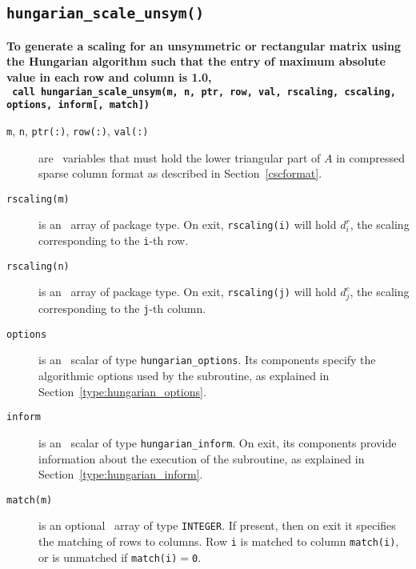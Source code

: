\subsection{\texttt{hungarian\_scale\_unsym()}}

\textbf{\noindent
   To generate a scaling for an unsymmetric or rectangular matrix using the Hungarian algorithm such that the entry of maximum absolute value in each row and column is 1.0,
   \vspace*{0.3cm} \\
   \texttt{ \hspace*{0.2cm}
      call hungarian\_scale\_unsym(m, n, ptr, row, val, rscaling, cscaling, options, inform[, match])
   }
   \vspace{0.3cm}
}

\begin{description}

\item[\texttt{m}, \texttt{n}, \texttt{ptr(:)}, \texttt{row(:)}, \texttt{val(:)}] are \intentin\ variables that must hold the lower triangular part of $A$ in compressed sparse column format as described in Section~\ref{cscformat}.

\item[\texttt{rscaling(m)}] is an \intentout\ array of package type. On exit,
\texttt{rscaling(i)} will hold $d^r_i$, the scaling corresponding to the
\texttt{i}-th row.

\item[\texttt{rscaling(n)}] is an \intentout\ array of package type. On exit,
\texttt{rscaling(j)} will hold $d^c_j$, the scaling corresponding to the
\texttt{j}-th column.

\item[\texttt{options}] is an \intentin\ scalar of type \texttt{hungarian\_options}. Its components specify the algorithmic options used by the subroutine, as explained in Section~\ref{type:hungarian_options}.

\item[\texttt{inform}] is an \intentout\ scalar of type \texttt{hungarian\_inform}. On exit, its components provide information about the execution of the subroutine, as explained in Section~\ref{type:hungarian_inform}.

\item[\texttt{match(m)}] is an optional \intentout\ array of type {\tt INTEGER}.
If present, then on exit it specifies the matching of rows to
columns. Row \texttt{i} is matched to column \texttt{match(i)}, or is unmatched
if \texttt{match(i)}$=$\texttt{0}.

\end{description}

